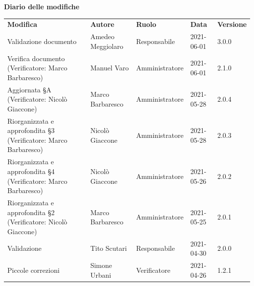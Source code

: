 \documentclass[a4paper]{article}
\begin{document}
\begin{center}
    \centering
    \textbf{\Large Diario delle modifiche}\\
    \vspace{10px}
    \renewcommand{\arraystretch}{1.8}
    \label{tab:Diario delle modifiche}
    \begin{longtable}[!h]{p{160px} p{80px} p{70px} p{55px} p{40px}}
        \rowcolor{logo!70} \textbf{Modifica}                                       & \textbf{Autore}                             & \textbf{Ruolo} & \textbf{Data} & \textbf{Versione} \\
        Validazione documento                                                      & Amedeo Meggiolaro                           & Responsabile   & 2021-06-01    & 3.0.0             \\
        Verifica documento \newline (Verificatore: Marco Barbaresco)               & Manuel Varo                                 & Amministratore & 2021-06-01    & 2.1.0             \\
        Aggiornata \S A \newline (Verificatore: Nicolò Giaccone)                   & Marco Barbaresco                            & Amministratore & 2021-05-28    & 2.0.4             \\
        Riorganizzata e approfondita \S3 \newline (Verificatore: Marco Barbaresco) & Nicolò Giaccone                             & Amministratore & 2021-05-28    & 2.0.3             \\
        Riorganizzata e approfondita \S4 \newline (Verificatore: Marco Barbaresco) & Nicolò Giaccone                             & Amministratore & 2021-05-26    & 2.0.2             \\
        Riorganizzata e approfondita \S2 \newline (Verificatore: Nicolò Giaccone)  & Marco Barbaresco                            & Amministratore & 2021-05-25    & 2.0.1             \\
        Validazione                                                                & Tito Scutari                                & Responsabile   & 2021-04-30    & 2.0.0             \\
        Piccole correzioni                                                         & Simone Urbani                               & Verificatore   & 2021-04-26    & 1.2.1             \\

\end{longtable}
\end{center}
\end{document}
